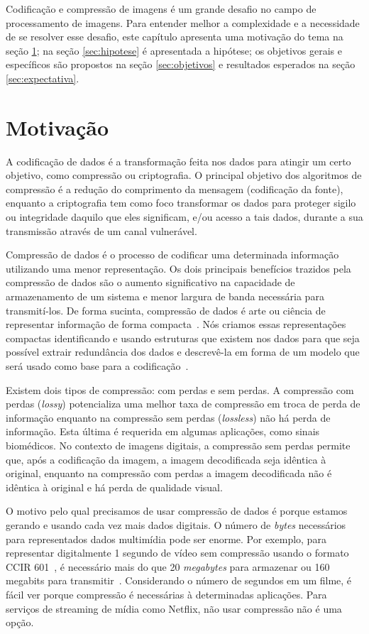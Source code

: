 Codificação e compressão de imagens é um grande desafio no campo de processamento de imagens. Para entender melhor a complexidade e a necessidade de se resolver esse desafio, este capítulo apresenta uma motivação do tema na seção \ref{sec:motivacao}; na seção \ref{sec:hipotese} é apresentada a hipótese; os objetivos gerais e específicos são propostos na seção \ref{sec:objetivos} e  resultados esperados na seção \ref{sec:expectativa}.

\section{Motivação}
\label{sec:motivacao}
A codificação de dados é a transformação feita nos dados para atingir um certo objetivo, como compressão ou criptografia. O principal objetivo dos algoritmos de compressão é a redução do comprimento da mensagem (codificação da fonte), enquanto a criptografia tem como foco transformar os dados para proteger sigilo ou integridade daquilo que eles significam, e/ou acesso a tais dados, durante a sua transmissão através de um canal vulnerável.

Compressão de dados é o processo de codificar uma determinada informação utilizando uma menor representação. Os dois principais benefícios trazidos pela compressão de dados são o aumento significativo na capacidade de armazenamento de um sistema e menor largura de banda necessária para transmití-los.  De forma sucinta, compressão de dados é arte ou ciência de representar informação de forma compacta~\cite{sayood2017introduction}. Nós criamos essas representações compactas identificando e usando estruturas que existem nos dados para que seja possível extrair redundância dos dados e descrevê-la em forma de um modelo que será usado como base para a codificação~\cite{sayood2017introduction}. 

Existem dois tipos de compressão: com perdas e sem perdas. A compressão com perdas (\textit{lossy}) potencializa uma melhor taxa de compressão em troca de perda de informação enquanto na compressão sem perdas (\textit{lossless}) não há perda de informação. Esta última é requerida em algumas aplicações, como sinais biomédicos. No contexto de imagens digitais, a compressão sem perdas permite que, após a codificação da imagem, a imagem decodificada seja idêntica à original, enquanto na compressão com perdas a imagem decodificada não é idêntica à original e há perda de qualidade visual.

O motivo pelo qual precisamos de usar compressão de dados é porque estamos gerando e usando cada vez mais dados digitais. O número de \textit{bytes} necessários para representados dados multimídia pode ser enorme. Por exemplo, para representar digitalmente 1 segundo de vídeo sem compressão usando o formato CCIR 601~\cite{sayood2017introduction}, é necessário mais do que 20 \textit{megabytes} para armazenar ou 160 megabits para transmitir~\cite{sayood2017introduction}. Considerando o número de segundos em um filme, é fácil ver porque compressão é necessárias à determinadas aplicações. Para serviços de streaming de mídia como Netflix, não usar compressão não é uma opção.

